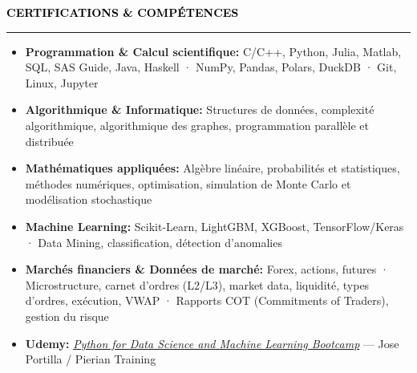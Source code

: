 \documentclass[10pt,english,french]{article}
\newcommand{\certificateIcon}[1][black]{\textcolor{#1}{\faClipboard}}
\newcommand{\cvsection}[1]{
    \vspace{4pt}
    \textbf{\fontsize{9pt}{10pt}\selectfont \textcolor{black}{#1}}
    \vspace{6pt}
    \hrule
    \vspace{6pt}
}
\begin{document}
\vspace{-8pt}
\cvsection{\certificateIcon[black]\hspace{4pt}CERTIFICATIONS \& COMPÉTENCES}

\vspace{-4pt}
\begin{itemize}[leftmargin=0.5cm, label=\textbullet, itemsep=0.12em]

    \item \textbf{Programmation \& Calcul scientifique\!:}
          C/C++, Python, Julia, Matlab, SQL, SAS Guide, Java, Haskell ·
          NumPy, Pandas, Polars, DuckDB ·
          Git, Linux, Jupyter

    \item \textbf{Algorithmique \& Informatique\!:}
          Structures de données, complexité algorithmique,
          algorithmique des graphes, programmation parallèle et distribuée

    \item \textbf{Mathématiques appliquées\!:}
          Algèbre linéaire, probabilités et statistiques,
          méthodes numériques, optimisation,
          simulation de Monte Carlo et modélisation stochastique

    \item \textbf{Machine Learning\!:}
          Scikit-Learn, LightGBM, XGBoost, TensorFlow/Keras ·
          Data Mining, classification, détection d'anomalies

    \item \textbf{Marchés financiers \& Données de marché\!:}
          Forex, actions, futures ·
          Microstructure, carnet d'ordres (L2/L3), market data,
          liquidité, types d'ordres, exécution, VWAP ·
          Rapports COT (Commitments of Traders), gestion du risque


    \item \textbf{Udemy\!:}
          \href{https://www.udemy.com/certificate/UC-51319000-ccb8-4c9c-9320-6cd9860e601c/}
          {\textit{Python for Data Science and Machine Learning Bootcamp}}
          --- Jose Portilla / Pierian Training
\end{itemize}
\end{document}
